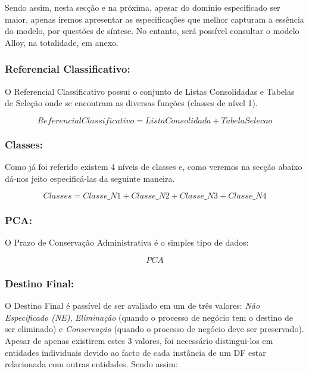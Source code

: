 \documentclass[tikz,runningheads,a4paper]{llncs}
\begin{document}
Sendo assim, nesta secção e na próxima, apesar do domínio especificado ser maior, apenas iremos apresentar as especificações que melhor capturam a essência do modelo, por questões de síntese. No entanto, será possível consultar o modelo Alloy, na totalidade, em anexo.

\subsubsection{Referencial Classificativo:}

O Referencial Classificativo possui o conjunto de Listas Consolidadas e Tabelas de Seleção onde se encontram as diversas funções (classes de nível 1).

\begin{equation*}
    ReferencialClassificativo = ListaConsolidada + TabelaSelecao
\end{equation*}

\subsubsection{Classes:}

Como já foi referido existem 4 níveis de classes e, como veremos na secção abaixo dá-nos jeito especificá-las da seguinte maneira.

\begin{equation*}
    Classes = Classe\_N1 + Classe\_N2 + Classe\_N3 + Classe\_N4
\end{equation*}

\subsubsection{PCA:}

O Prazo de Conservação Administrativa é o simples tipo de dados:

\begin{equation*}
    PCA
\end{equation*}

\subsubsection{Destino Final:}

O Destino Final é passível de ser avaliado em um de três valores: \textit{Não Especificado (NE)}, \textit{Eliminação} (quando o processo de negócio tem o destino de ser eliminado) e \textit{Conservação} (quando o processo de negócio deve ser preservado). Apesar de apenas existirem estes 3 valores, foi necessário distingui-los em entidades individuais devido ao facto de cada instância de um DF estar relacionada com outras entidades. Sendo assim:
\end{document}
